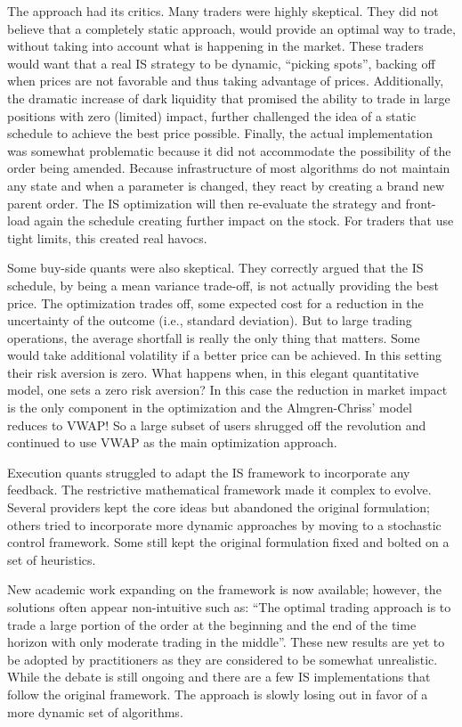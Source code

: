 The approach had its critics. Many traders were highly skeptical. They did not believe that a completely static approach, would provide an optimal way to trade, without taking into account what is happening in the market. These traders would want that a real IS strategy to be dynamic, ``picking spots'', backing off when prices are not favorable and thus taking advantage of prices.  Additionally, the dramatic increase of dark liquidity that promised the ability to trade in large positions with zero (limited) impact, further challenged the idea of a static schedule to achieve the best price possible. Finally, the actual implementation was somewhat problematic because it did not accommodate the possibility of the order being amended. Because infrastructure of most algorithms do not maintain any state and when a parameter is changed, they react by creating a brand new parent order. The IS optimization will then re-evaluate the strategy and front-load again the schedule creating further impact on the stock. For traders that use tight limits, this created real havocs.


Some buy-side quants were also skeptical. They correctly argued that the IS schedule, by being a mean variance trade-off, is not actually providing the best price. The optimization trades off, some expected cost for a reduction in the uncertainty of the outcome (i.e., standard deviation). But to large trading operations, the average shortfall is really the only thing that matters. Some would take additional volatility if a better price can be achieved. In this setting their risk aversion is zero. What happens when, in this elegant quantitative model, one sets a zero risk aversion? In this case the reduction in market impact is the only component in the optimization and the Almgren-Chriss' model reduces to VWAP! So a large subset of users shrugged off the revolution and continued to use VWAP as the main optimization approach.


Execution quants struggled to adapt the IS framework to incorporate any feedback. The restrictive mathematical framework made it complex to evolve. Several providers kept the core ideas but abandoned the original formulation; others tried to incorporate more dynamic approaches by moving to a stochastic control framework. Some still kept the original formulation fixed and bolted on a set of heuristics.


New academic work expanding on the framework is now available; however, the solutions often appear non-intuitive such as: ``The optimal trading approach is to trade a large portion of the order at the beginning and the end of the time horizon with only moderate trading in the middle''. These new results are yet to be adopted by practitioners as they are considered to be somewhat unrealistic. While the debate is still ongoing and there are a few IS implementations that follow the original framework. The approach is slowly losing out in favor of a more dynamic set of algorithms. \twomedskip


